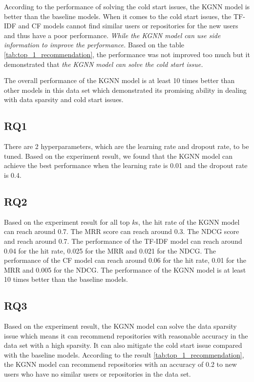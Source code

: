 \documentclass[11pt,twoside]{report}
\begin{document}
According to the performance of solving the cold start issues, the KGNN model is better than the baseline models. When it comes to the cold start issues, the TF-IDF and CF models cannot find similar users or repositories for the new users and thus have a poor performance. \textit{While the KGNN model can use side information to improve the performance.} Based on the table \ref{tab:top_1_recommendation}, the performance was not improved too much but it demonstrated that \textit{the KGNN model can solve the cold start issue.}

The overall performance of the KGNN model is at least 10 times better than other models in this data set which demonstrated its promising ability in dealing with data sparsity and cold start issues.

\subsection{RQ1}
There are 2 hyperparameters, which are the learning rate and dropout rate, to be tuned. Based on the experiment result, we found that the KGNN model can achieve the best performance when the learning rate is 0.01 and the dropout rate is 0.4.

\subsection{RQ2}
Based on the experiment result for all top $k$s, the hit rate of the KGNN model can reach around 0.7. The MRR score can reach around 0.3. The NDCG score and reach around 0.7. The performance of the TF-IDF model can reach around 0.04 for the hit rate, 0.025 for the MRR and 0.021 for the NDCG. The performance of the CF model can reach around 0.06 for the hit rate, 0.01 for the MRR and 0.005 for the NDCG. The performance of the KGNN model is at least 10 times better than the baseline models.

\subsection{RQ3}
Based on the experiment result, the KGNN model can solve the data sparsity issue which means it can recommend repositories with reasonable accuracy in the data set with a high sparsity. It can also mitigate the cold start issue compared with the baseline models. According to the result \ref{tab:top_1_recommendation}, the KGNN model can recommend repositories with an accuracy of 0.2 to new users who have no similar users or repositories in the data set.
\end{document}
